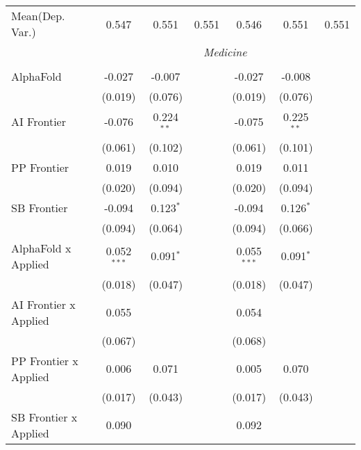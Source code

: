 \begin{tabular}{lcccccc}
Mean(Dep. Var.) & 0.547 & 0.551 & 0.551 & 0.546 & 0.551 & 0.551 \\
 & \multicolumn{6}{c}{\textit{Medicine}} \\ \\
   AlphaFold                    & -0.027        & -0.007       &              & -0.027        & -0.008       &   \\   
                                & (0.019)       & (0.076)      &              & (0.019)       & (0.076)      &   \\   
   AI Frontier                  & -0.076        & 0.224$^{**}$ &              & -0.075        & 0.225$^{**}$ &   \\   
                                & (0.061)       & (0.102)      &              & (0.061)       & (0.101)      &   \\   
   PP Frontier                  & 0.019         & 0.010        &              & 0.019         & 0.011        &   \\   
                                & (0.020)       & (0.094)      &              & (0.020)       & (0.094)      &   \\   
   SB Frontier                  & -0.094        & 0.123$^{*}$  &              & -0.094        & 0.126$^{*}$  &   \\   
                                & (0.094)       & (0.064)      &              & (0.094)       & (0.066)      &   \\   
   AlphaFold x Applied          & 0.052$^{***}$ & 0.091$^{*}$  &              & 0.055$^{***}$ & 0.091$^{*}$  &   \\   
                                & (0.018)       & (0.047)      &              & (0.018)       & (0.047)      &   \\   
   AI Frontier x Applied        & 0.055         &              &              & 0.054         &              &   \\   
                                & (0.067)       &              &              & (0.068)       &              &   \\   
   PP Frontier x Applied        & 0.006         & 0.071        &              & 0.005         & 0.070        &   \\   
                                & (0.017)       & (0.043)      &              & (0.017)       & (0.043)      &   \\   
   SB Frontier x Applied        & 0.090         &              &              & 0.092         &              &   \\   

\end{tabular}
